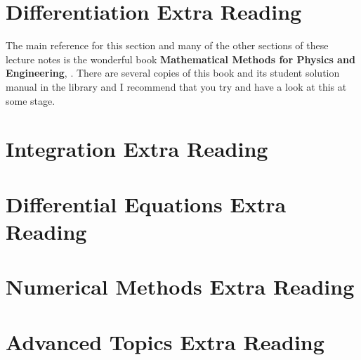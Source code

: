 \section{Differentiation Extra Reading}
The main reference for this section and many of the other sections of these lecture notes is the wonderful book \textbf{Mathematical Methods for Physics and Engineering}, \citep{riley_mathematical_2006}. There are several copies of this book and its student solution manual in the library and I recommend that you try and have a look at this at some stage.\\

\section{Integration Extra Reading}

\section{Differential Equations Extra Reading}

\section{Numerical Methods Extra Reading}

\section{Advanced Topics Extra Reading}